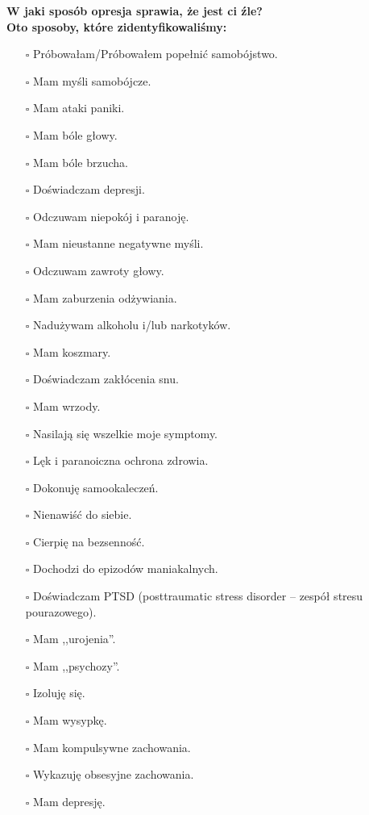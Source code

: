 \noindent\textcolor{ProcessBlue}{\textbf{\Large{W jaki sposób opresja sprawia, że jest ci źle?}}}\\
\textbf{\large{Oto sposoby, które zidentyfikowaliśmy:}}
\begin{multicols}{2}
\begin{itemize}
\item[$\square$]{Próbowałam/Próbowałem popełnić samobójstwo.}
\item[$\square$]{Mam myśli samobójcze.}
\item[$\square$]{Mam ataki paniki.}
\item[$\square$]{Mam bóle głowy.}
\item[$\square$]{Mam bóle brzucha.}
\item[$\square$]{Doświadczam depresji.}
\item[$\square$]{Odczuwam niepokój i paranoję.}
\item[$\square$]{Mam nieustanne negatywne myśli.}
\item[$\square$]{Odczuwam zawroty głowy.}
\item[$\square$]{Mam zaburzenia odżywiania.}
\item[$\square$]{Nadużywam alkoholu i/lub narkotyków.}
\item[$\square$]{Mam koszmary.}
\item[$\square$]{Doświadczam zakłócenia snu.}
\item[$\square$]{Mam wrzody.}
\item[$\square$]{Nasilają się wszelkie moje symptomy.}
\item[$\square$]{Lęk i paranoiczna ochrona zdrowia.}
\item[$\square$]{Dokonuję samookaleczeń.}
\item[$\square$]{Nienawiść do siebie.}
\item[$\square$]{Cierpię na bezsenność.}
\item[$\square$]{Dochodzi do epizodów maniakalnych.}
\item[$\square$]{Doświadczam PTSD (posttraumatic stress disorder -- zespół stresu pourazowego).}
\item[$\square$]{Mam ,,urojenia''.}
\item[$\square$]{Mam ,,psychozy''.}
\item[$\square$]{Izoluję się.}
\item[$\square$]{Mam wysypkę.}
\item[$\square$]{Mam kompulsywne zachowania.}
\item[$\square$]{Wykazuję obsesyjne zachowania.}
\item[$\square$]{Mam depresję.}
\end{itemize}
\end{multicols}


